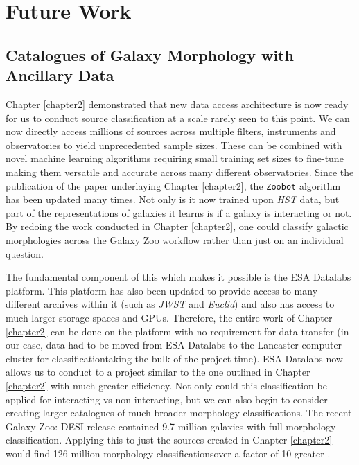 \section{Future Work}
\subsection{Catalogues of Galaxy Morphology with Ancillary Data}
\noindent Chapter \ref{chapter2} demonstrated that new data access architecture is now ready for us to conduct source classification at a scale rarely seen to this point. We can now directly access millions of sources across multiple filters, instruments and observatories to yield unprecedented sample sizes. These can be combined with novel machine learning algorithms requiring small training set sizes to fine-tune making them versatile and accurate across many different observatories. Since the publication of the paper underlaying Chapter \ref{chapter2}, the \texttt{Zoobot} algorithm has been updated many times. Not only is it now trained upon \textit{HST} data, but part of the representations of galaxies it learns is if a galaxy is interacting or not. By redoing the work conducted in Chapter \ref{chapter2}, one could classify galactic morphologies across the Galaxy Zoo workflow rather than just on an individual question.

The fundamental component of this which makes it possible is the ESA Datalabs platform. This platform has also been updated to provide access to many different \DIFdelbegin {}\DIFdelend \DIFaddbegin {}\DIFaddend archives within it (such as \emph{JWST} and \emph{Euclid}) and also has access to much larger storage spaces and GPUs. Therefore, the entire work of Chapter \ref{chapter2} can be done on the platform with no requirement for data transfer (in our case, data had to be moved from ESA Datalabs to the Lancaster computer cluster for classification\DIFdelbegin \DIFdel{: }\DIFdelend \DIFaddbegin \DIFadd{, }\DIFaddend taking the bulk of the project time). ESA Datalabs now allows us to conduct to a project similar to the one outlined in Chapter \ref{chapter2} with much greater efficiency. Not only could this classification be applied for interacting vs non-interacting, but we can also begin to consider creating larger catalogues of much broader morphology classifications. The recent Galaxy Zoo: DESI release contained 9.7 million galaxies with full morphology classification. Applying this to just the sources created in Chapter \ref{chapter2} would find 126 million morphology classifications\DIFdelbegin \DIFdel{- }\DIFdelend \DIFaddbegin {}\DIFaddend over a factor of 10 greater \DIFaddbegin {}\DIFaddend .

